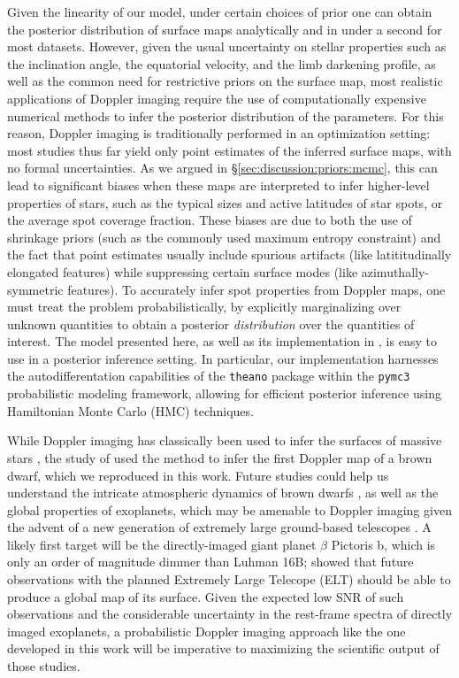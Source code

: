 \documentclass[modern]{aastex631}
\begin{document}
Given the linearity of our model, under certain choices of prior one can obtain the posterior distribution of surface maps analytically and in under a second for most datasets. 
However, given the usual uncertainty on stellar properties such as the inclination angle, the equatorial velocity, and the limb darkening profile, as well as the common need for restrictive priors on the surface map, most realistic applications of Doppler imaging require the use of computationally expensive numerical methods to infer the posterior distribution of the parameters.
For this reason, Doppler imaging is traditionally performed in an optimization setting: most studies thus far yield only point estimates of the inferred surface maps, with no formal uncertainties.
As we argued in \S\ref{sec:discussion:priors:mcmc}, this can lead to significant biases when these maps are interpreted to infer higher-level properties of stars, such as the typical sizes and active latitudes of star spots, or the average spot coverage fraction.
These biases are due to both the use of shrinkage priors (such as the commonly used maximum entropy constraint) and the fact that point estimates usually include spurious artifacts (like latititudinally elongated features) while suppressing certain surface modes (like azimuthally-symmetric features).
To accurately infer spot properties from Doppler maps, one must treat the problem probabilistically, by explicitly marginalizing over unknown quantities to obtain a posterior \emph{distribution} over the quantities of interest.
The model presented here, as well as its implementation in \starry, is easy to use in a posterior inference setting.
In particular, our implementation harnesses the autodifferentation capabilities of the \texttt{theano} \citep{Bergstra2010} package within the \texttt{pymc3} \citep{Salvatier2016} probabilistic modeling framework, allowing for efficient posterior inference using Hamiltonian Monte Carlo (HMC) techniques.

While Doppler imaging has classically been used to infer the surfaces of massive stars , the study of \citet{Crossfield2014} used the method to infer the first Doppler map of a brown dwarf, which we reproduced in this work.
Future studies could help us understand the intricate atmospheric dynamics of brown dwarfs \citep{Tan2021a,Tan2021b}, as well as the global properties of exoplanets, which may be amenable to Doppler imaging given the advent of a new generation of extremely large ground-based telescopes \citep{Crossfield2014b}.
A likely first target will be the directly-imaged giant planet $\beta$ Pictoris b, which is only an order of magnitude dimmer than Luhman 16B; \citet{Snellen2014} showed that future observations with the planned Extremely Large Telecope (ELT) should be able to produce a global map of its surface.
Given the expected low SNR of such observations and the considerable uncertainty in the rest-frame spectra of directly imaged exoplanets, a probabilistic Doppler imaging approach like the one developed in this work will be imperative to maximizing the scientific output of those studies.
\end{document}
